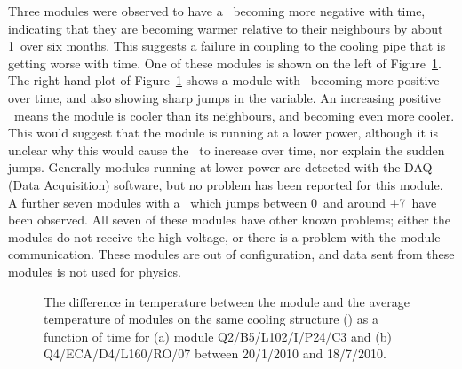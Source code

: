 Three modules were observed to have a \tdiff\ becoming more negative with time,
indicating that they are becoming warmer relative to their neighbours by about
1\dc\ over six months. This suggests a failure in coupling to the cooling pipe
that is getting worse with time. One of these modules is shown on the left of
Figure~\ref{fig:pm_ev_tdiff}.  The right hand plot of
Figure~\ref{fig:pm_ev_tdiff} shows a module with \tdiff\ becoming more positive
over time, and also showing sharp jumps in the variable. An increasing positive
\tdiff\ means the module is cooler than its neighbours, and becoming even more
cooler. This would suggest that the module is running at a lower power, although
it is unclear why this would cause the \tdiff\ to increase over time, nor explain
the sudden jumps. Generally modules running at lower power are detected with the
DAQ (Data Acquisition) software, but no problem has been reported for this
module. A further seven modules with a \tdiff\ which jumps between 0\dc\ and
around +7\dc\ have been observed.  All seven of these modules have other known
problems; either the modules do not receive the high voltage, or there is a
problem with the module communication. These modules are out of configuration,
and data sent from these modules is not used for physics.

\begin{figure}[h]
 	\centering
	\caption[The difference in temperature between the module and the average
  temperature of modules on the same cooling structure (\tdiff) as a function of
  time for module Q2/B5/L102/I/P24/C3 and Q4/ECA/D4/L160/RO/07 between
  20/1/2010 and 18/7/2010. ]{The difference in temperature between the module and the average
  temperature of modules on the same cooling structure (\tdiff) as a function of
  time for (a) module Q2/B5/L102/I/P24/C3 and (b) Q4/ECA/D4/L160/RO/07 between
  20/1/2010 and 18/7/2010. }
	\label{fig:pm_ev_tdiff}
\end{figure}


